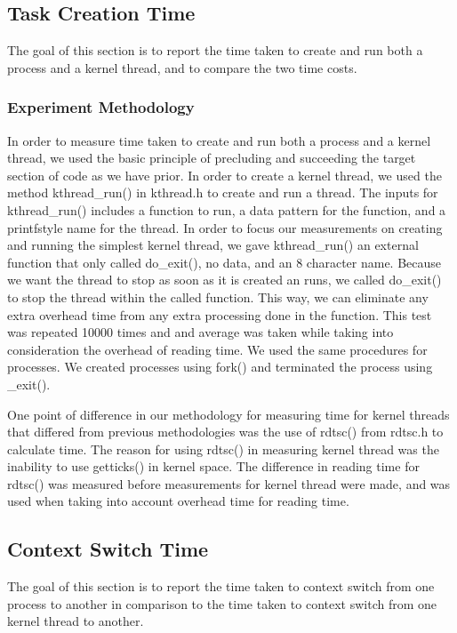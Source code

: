\documentclass{article} %
\begin{document}
\subsection{Task Creation Time}
The goal of this section is to report the time taken to create and run both a process and a kernel thread, and to compare the two time costs.  

\subsubsection{Experiment Methodology}
In order to measure time taken to create and run both a process and a kernel thread, we used the basic principle of precluding and succeeding the target section of code as we have prior. In order to create a kernel thread, we used the method kthread\_run() in kthread.h to create and run a thread. The inputs for kthread\_run() includes a function to run, a data pattern for the function, and a printf\-style name for the thread. In order to focus our measurements on creating and running the simplest kernel thread, we gave kthread\_run() an external function that only called do\_exit(), no data, and an 8 character name. Because we want the thread to stop as soon as it is created an runs, we called do\_exit() to stop the thread within the called function. This way, we can eliminate any extra overhead time from any extra processing done in the function. This test was repeated 10000 times and and average was taken while taking into consideration the overhead of reading time. We used the same procedures for processes. We created processes using fork() and terminated the process using \_exit().

One point of difference in our methodology for measuring time for kernel threads that differed from previous methodologies was the use of rdtsc() from rdtsc.h to calculate time. The reason for using rdtsc() in measuring kernel thread was the inability to use getticks() in kernel space. The difference in reading time for rdtsc() was measured before measurements for kernel thread were made, and was used when taking into account overhead time for reading time. 

\subsection{Context Switch Time}
The goal of this section is to report the time taken to context switch from one process to another in comparison to the time taken to context switch from one kernel thread to another. 
\end{document}
